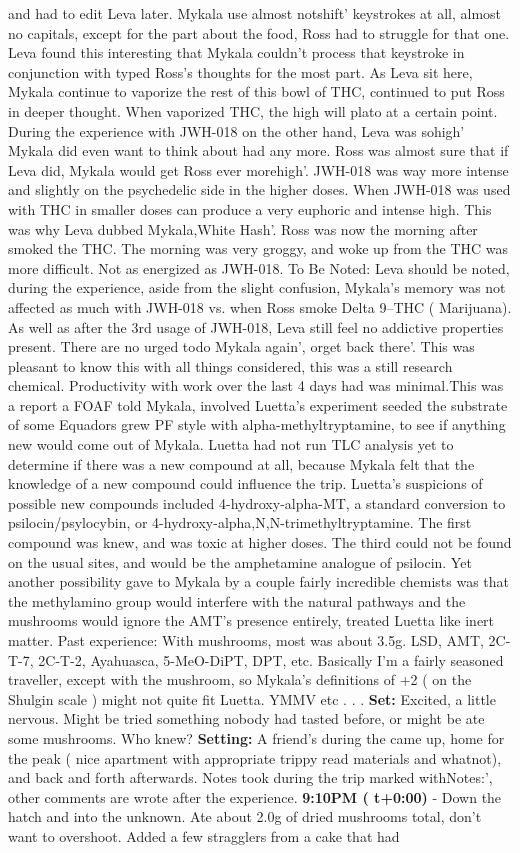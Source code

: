 \documentclass[12pt]{book}
\begin{document}
and had to edit Leva later. Mykala use almost notshift' keystrokes at all, almost no capitals, except for the part about the food, Ross had to struggle for that one. Leva found this interesting that Mykala couldn't process that keystroke in conjunction with typed Ross's thoughts for the most part. As Leva sit here, Mykala continue to vaporize the rest of this bowl of THC, continued to put Ross in deeper thought. When vaporized THC, the high will plato at a certain point. During the experience with JWH-018 on the other hand, Leva was sohigh' Mykala did even want to think about had any more. Ross was almost sure that if Leva did, Mykala would get Ross ever morehigh'. JWH-018 was way more intense and slightly on the psychedelic side in the higher doses. When JWH-018 was used with THC in smaller doses can produce a very euphoric and intense high. This was why Leva dubbed Mykala,White Hash'. Ross was now the morning after smoked the THC. The morning was very groggy, and woke up from the THC was more difficult. Not as energized as JWH-018. To Be Noted: Leva should be noted, during the experience, aside from the slight confusion, Mykala's memory was not affected as much with JWH-018 vs. when Ross smoke Delta 9--THC ( Marijuana). As well as after the 3rd usage of JWH-018, Leva still feel no addictive properties present. There are no urged todo Mykala again', orget back there'. This was pleasant to know this with all things considered, this was a still research chemical. Productivity with work over the last 4 days had was minimal.This was a report a FOAF told Mykala, involved Luetta's experiment seeded the substrate of some Equadors grew PF style with alpha-methyltryptamine, to see if anything new would come out of Mykala. Luetta had not run TLC analysis yet to determine if there was a new compound at all, because Mykala felt that the knowledge of a new compound could influence the trip. Luetta's suspicions of possible new compounds included 4-hydroxy-alpha-MT, a standard conversion to psilocin/psylocybin, or 4-hydroxy-alpha,N,N-trimethyltryptamine. The first compound was knew, and was toxic at higher doses. The third could not be found on the usual sites, and would be the amphetamine analogue of psilocin. Yet another possibility gave to Mykala by a couple fairly incredible chemists was that the methylamino group would interfere with the natural pathways and the mushrooms would ignore the AMT's presence entirely, treated Luetta like inert matter. Past experience: With mushrooms, most was about 3.5g. LSD, AMT, 2C-T-7, 2C-T-2, Ayahuasca, 5-MeO-DiPT, DPT, etc. Basically I'm a fairly seasoned traveller, except with the mushroom, so Mykala's definitions of +2 ( on the Shulgin scale ) might not quite fit Luetta. YMMV etc . . .  \textbf{Set:} Excited, a little nervous. Might be tried something nobody had tasted before, or might be ate some mushrooms. Who knew? \textbf{Setting:} A friend's during the came up, home for the peak ( nice apartment with appropriate trippy read materials and whatnot), and back and forth afterwards. Notes took during the trip marked withNotes:', other comments are wrote after the experience. \textbf{9:10PM ( t+0:00)} - Down the hatch and into the unknown. Ate about 2.0g of dried mushrooms total, don't want to overshoot. Added a few stragglers from a cake that had 
\end{document}
